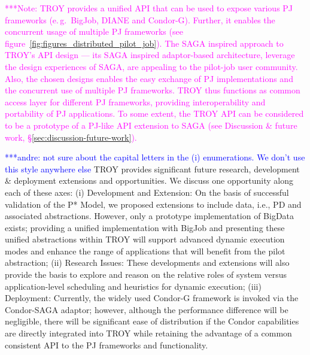 \documentclass[conference,final]{IEEEtran}
\newcommand{\alnote}[1]{ {\textcolor{blue} { ***andre: #1 }}}
\newcommand{\note}[1]{ {\textcolor{magenta} { ***Note: #1 }}}
\newcommand{\alnote}[1]{}
\newcommand{\note}[1]{}
\begin{document}

\note{TROY provides a
  unified API that can be used to expose various PJ frameworks
  (e.\,g.\ BigJob, DIANE and Condor-G). Further, it enables the
  concurrent usage of multiple PJ frameworks (see
  figure~\ref{fig:figures_distributed_pilot_job}).  The SAGA inspired
  approach to TROY's API design --- its SAGA inspired adaptor-based
  architecture, leverage the design experiences of SAGA, are appealing
  to the pilot-job user community. Also, the chosen designs enables
  the easy exchange of PJ implementations and the concurrent use of
  multiple PJ frameworks. TROY thus functions as common access layer
  for different PJ frameworks, providing interoperability and
  portability of PJ applications. To some extent, the TROY API can be
  considered to be a prototype of a PJ-like API extension to SAGA (see
  Discussion \& future work, \S\ref{sec:discussion-future-work}).}

\alnote{not sure about the capital letters in the (i) enumerations.
We don't use this style anywhere else}
TROY provides significant future research, development \& deployment
extensions and opportunities. We discuss one opportunity along each of
these axes: (i) Development and Extension: On the basis of successful
validation of the P* Model, we proposed extensions to include data,
i.e., PD and associated abstractions. However, only a prototype
implementation of BigData exists; providing a unified implementation
with BigJob and presenting these unified abstractions within TROY will
support advanced dynamic execution modes and enhance the range of
applications that will benefit from the pilot abstraction; (ii)
Research Issues: These developments and extensions will also provide
the basis to explore and reason on the relative roles of system versus
application-level scheduling and heuristics for dynamic execution;
(iii) Deployment: Currently, the widely used Condor-G 
framework is invoked via the Condor-SAGA adaptor; however, although
the performance difference will be negligible, there will be
significant ease of distribution if the Condor capabilities are directly 
integrated into TROY while retaining the advantage of a
common consistent API to the PJ frameworks and functionality.  %
\end{document}
